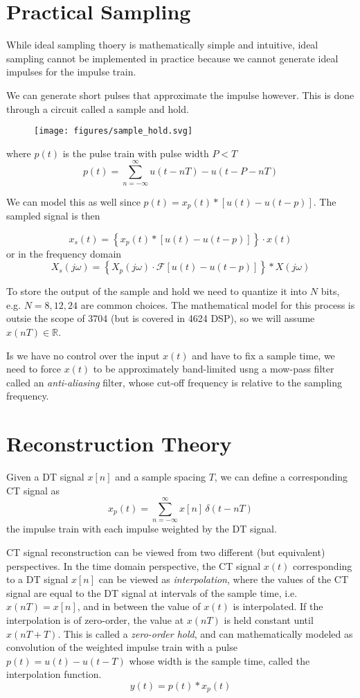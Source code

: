 \documentclass{article}
\begin{document}
\section{Practical Sampling}

While ideal sampling thoery is mathematically simple and intuitive, ideal sampling cannot be implemented in practice because we cannot generate ideal impulses for the impulse train.

We can generate short pulses that approximate the impulse however. This is done through a circuit called a sample and hold.

\begin{figure}
  \centering
  \texttt{[image: figures/sample\_hold.svg]}
\end{figure}
where $p(t)$ is the pulse train with pulse width $P < T$
\[
p(t) = \sum\limits_{n=-\infty}^{\infty} u(t-nT) - u(t-P-nT)
\]

We can model this as well since $p(t) = x_p(t) * \left[u(t) - u(t-p) \right]$. The sampled signal is then

\[
x_s(t) = \left\{ x_p(t) * \left[u(t) - u(t-p) \right] \right\}\cdot x(t)
\]
or in the frequency domain
\[
X_s(j\omega) = \left\{ X_p(j\omega)\cdot \mathcal{F}\left[u(t) - u(t-p) \right] \right\}* X(j\omega)
\]

To store the output of the sample and hold we need to quantize it into $N$ bits, e.g. $N = 8, 12, 24$ are common choices. The mathematical model for this process is outsie the scope of 3704 (but is covered in 4624 DSP), so we will assume $x(nT) \in\mathbb{R}$.

Is we have no control over the input $x(t)$ and have to fix a sample time, we need to force $x(t)$ to be approximately band-limited usng a mow-pass filter called an \textit{anti-aliasing} filter, whose cut-off frequency is relative to the sampling frequency.

\section{Reconstruction Theory}

Given a DT signal $x[n]$ and a sample spacing $T$, we can define a corresponding CT signal as 
\[
x_p(t) = \sum\limits_{n = -\infty}^{\infty} x[n] \, \delta(t-nT)
\]
the impulse train with each impulse weighted by the DT signal.

CT signal reconstruction can be viewed from two different (but equivalent) perspectives. In the time domain perspective, the CT signal $x(t)$ corresponding to a DT signal $x[n]$ can be viewed as \emph{interpolation}, where the values of the CT signal are equal to the DT signal at intervals of the sample time, i.e. $x(nT) = x[n]$, and in between the value of $x(t)$ is interpolated. If the interpolation is of zero-order, the value at $x(nT)$ is held constant until $x(nT+T)$. This is called a \emph{zero-order hold}, and can mathematically modeled as convolution of the weighted impulse train with a pulse $p(t) = u(t) - u(t-T)$ whose width is the sample time, called the interpolation function.
\[
y(t) = p(t)*x_p(t)
\]
\end{document}
